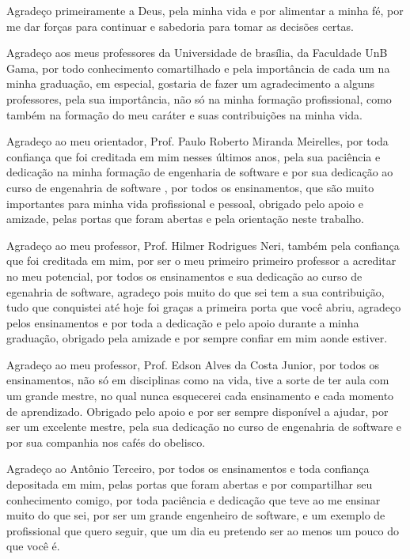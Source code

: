 \begin{agradecimentos}
Agradeço primeiramente a Deus, pela minha vida e por alimentar a minha fé, por
me dar forças para continuar e sabedoria para tomar as decisões certas.

Agradeço aos meus professores da Universidade de brasília, da Faculdade UnB Gama,
por todo conhecimento comartilhado e pela importância de cada um na minha graduação,
em especial, gostaria de fazer um agradecimento a alguns professores,
pela sua importância, não só na minha formação profissional, como também na formação
do meu caráter e suas contribuições na minha vida.

Agradeço ao meu orientador, Prof. Paulo Roberto Miranda Meirelles, por toda confiança
que foi creditada em mim nesses últimos anos, pela sua paciência e dedicação na minha
formação de engenharia de software e por sua dedicação ao curso de engenahria de software
, por todos os ensinamentos, que são muito importantes
para minha vida profissional e pessoal, obrigado pelo apoio e amizade, pelas portas
que foram abertas e pela orientação neste trabalho.

Agradeço ao meu professor, Prof. Hilmer Rodrigues Neri, também pela confiança que foi
creditada em mim, por ser o meu primeiro primeiro professor a acreditar no meu
potencial, por todos os ensinamentos e sua dedicação ao curso de egenahria de software, 
agradeço pois muito do que sei tem a sua
contribuição, tudo que conquistei até hoje foi graças a primeira porta que você
abriu, agradeço pelos ensinamentos e por toda a dedicação e pelo apoio durante a
minha graduação, obrigado pela amizade e por sempre confiar em mim aonde estiver.

Agradeço ao meu professor, Prof. Edson Alves da Costa Junior, por todos os ensinamentos, não
só em disciplinas como na vida, tive a sorte de ter aula com um grande mestre,
no qual nunca esquecerei cada ensinamento e cada momento de aprendizado. Obrigado
pelo apoio e por ser sempre disponível a ajudar, por ser um excelente mestre, pela
sua dedicação no curso de engenahria de software e por sua companhia nos cafés do obelisco.

Agradeço ao Antônio Terceiro, por todos os ensinamentos e toda confiança depositada
em mim, pelas portas que foram abertas e por compartilhar seu conhecimento comigo, 
por toda paciência e dedicação que teve ao me ensinar muito do que sei, por ser
um grande engenheiro de software, e um exemplo de profissional que quero seguir, 
que um dia eu pretendo ser ao menos um pouco do que você é.


\end{agradecimentos}
